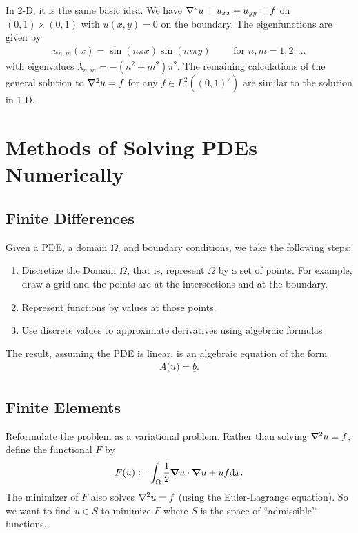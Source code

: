 \documentclass{article}
\begin{document}
        In 2-D, it is the same basic idea.  We have $\laplacian u = u_{xx} + u_{yy} = f$ on $(0,1) \times (0,1)$ with $u(x,y) = 0$ on the boundary.  The eigenfunctions are given by
        \begin{align}
            u_{n,m}(x) = \sin(n\pi x)\sin(m\pi y) \qquad \text{ for } n,m = 1, 2, \dots
        \end{align}
        with eigenvalues $\lambda_{n,m} = -(n^2 + m^2)\pi^2$.  The remaining calculations of the general solution to $\laplacian u = f$ for any $f \in L^2((0,1)^2)$ are similar to the solution in 1-D.

        \section{Methods of Solving PDEs Numerically}
            \subsection{Finite Differences}
                Given a PDE, a domain $\Omega$, and boundary conditions, we take the following steps:
                \begin{enumerate}[\ \ 1)]
                    \item Discretize the Domain $\Omega$, that is, represent $\Omega$ by a set of points.  For example, draw a grid and the points are at the intersections and at the boundary.
                    \item Represent functions by values at those points.
                    \item Use discrete values to approximate derivatives using algebraic formulas
                \end{enumerate}
                The result, assuming the PDE is linear, is an algebraic equation of the form
                \begin{align}
                    A\underline(u) = \underline{b}.
                \end{align}
            \subsection{Finite Elements}
                Reformulate the problem as a variational problem.  Rather than solving $\laplacian u = f$, define the functional $F$ by
                \begin{align}
                    F(u) \coloneqq \int_\Omega \frac{1}{2}\grad u \cdot \grad u + u f \dd x.
                \end{align}
                The minimizer of $F$ also solves $\laplacian u = f$ (using the Euler-Lagrange equation).  So we want to find $u \in S$ to minimize $F$ where $S$ is the space of ``admissible'' functions.
\end{document}

